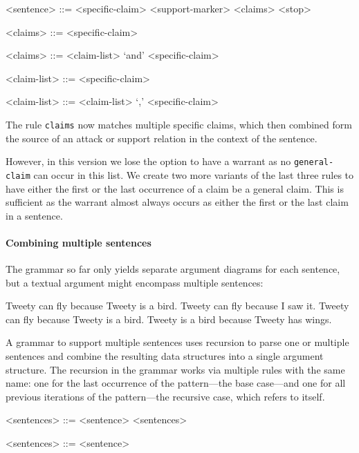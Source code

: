 \begin{grammar}

<sentence> ::= <specific-claim> <support-marker> <claims> <stop>

<claims> ::= <specific-claim>

<claims> ::= <claim-list> `and' <specific-claim>

<claim-list> ::= <specific-claim>

<claim-list> ::= <claim-list> `,' <specific-claim>

\end{grammar}

The rule \texttt{claims} now matches multiple specific claims, which then combined form the source of an attack or support relation in the context of the sentence.

However, in this version we lose the option to have a warrant as no \texttt{general-claim} can occur in this list. We create two more variants of the last three rules to have either the first or the last occurrence of a claim be a general claim. This is sufficient as the warrant almost always occurs as either the first or the last claim in a sentence.

\paragraph{Combining multiple sentences} The grammar so far only yields separate argument diagrams for each sentence, but a textual argument might encompass multiple sentences:

\begin{exe}
	\ex\label{ex:m1} Tweety can fly because Tweety is a bird. Tweety can fly because I saw it.
	\ex\label{ex:m2} Tweety can fly because Tweety is a bird. Tweety is a bird because Tweety has wings.
\end{exe}

A grammar to support multiple sentences uses recursion to parse one or multiple sentences and combine the resulting data structures into a single argument structure. The recursion in the grammar works via multiple rules with the same name: one for the last occurrence of the pattern---the base case---and one for all previous iterations of the pattern---the recursive case, which refers to itself.

\begin{grammar}
<sentences> ::= <sentence> <sentences>

<sentences> ::= <sentence>
\end{grammar}

